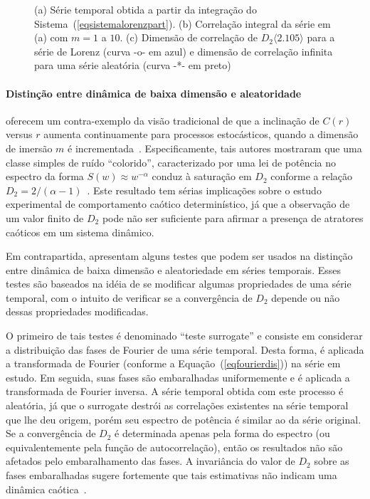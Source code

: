 \begin{figure}[ht]
\caption{(a) Série temporal obtida a partir da integração do Sistema~(\ref{eqsistemalorenzpart}). (b) Correlação integral da série em (a) com $m=1$ a $10$. (c) Dimensão de correlação de $D_{2}\langle2.105\rangle$ para a série de Lorenz (curva -o- em azul) e dimensão de correlação infinita para uma série aleatória (curva -*- em preto)}
\label{figlorenzdimensoes}
\end{figure}

\paragraph*{Distinção entre dinâmica de baixa dimensão e aleatoridade}

 oferecem um contra-exemplo da visão tradicional de que a inclinação de $C(r)$ versus $r$ aumenta continuamente para processos estocásticos, quando a dimensão de imersão $m$ é incrementada~\cite{grassproca/83}. Especificamente, tais autores mostraram que uma classe simples de ruído ``colorido'', caracterizado por uma lei de potência no espectro da forma $S(w)\approx w^{-\alpha}$ conduz à saturação em $D_{2}$ conforme a relação $D_{2}=2/(\alpha-1)$~\cite{osboproven/89,theilerj/91}. Este resultado tem sérias implicações sobre o estudo experimental de comportamento caótico determinístico, já que a observação de um valor finito de $D_{2}$ pode não ser suficiente para afirmar a presença de atratores caóticos em um sistema dinâmico. 

Em contrapartida,  apresentam alguns testes que podem ser usados na distinção entre dinâmica de baixa dimensão e aleatoriedade em séries temporais. Esses testes são baseados na idéia de se modificar algumas propriedades de uma série temporal, com o intuito de verificar se a convergência de $D_{2}$ depende ou não dessas propriedades modificadas. 

O primeiro de tais testes é denominado ``teste surrogate'' e consiste em considerar a distribuição das fases de Fourier de uma série temporal. Desta forma, é aplicada a transformada de Fourier (conforme a Equação~(\ref{eqfourierdis})) na série em estudo. Em seguida, suas fases são embaralhadas uniformemente e é aplicada a transformada de Fourier inversa. A série temporal obtida com este processo é aleatória, já que o surrogate destrói as correlações existentes na série temporal que lhe deu origem, porém seu espectro de potência é similar ao da série original. Se a convergência de $D_{2}$ é determinada apenas pela forma do espectro (ou equivalentemente pela função de autocorrelação), então os resultados não são afetados pelo embaralhamento das fases. A invariância do valor de $D_{2}$ sobre as fases embaralhadas sugere fortemente que tais estimativas não indicam uma dinâmica caótica~\cite{provenzalesmith/92}. 

